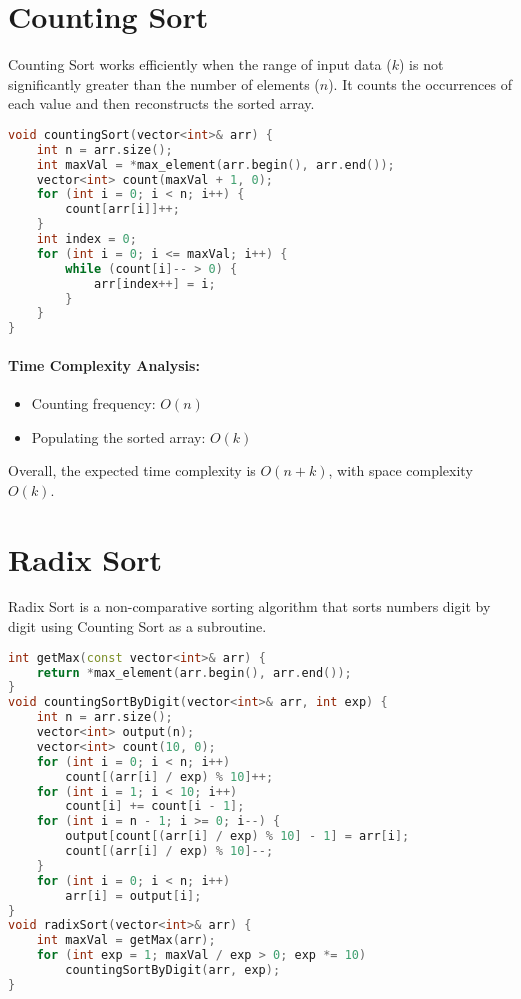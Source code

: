 \section{Counting Sort}
Counting Sort works efficiently when the range of input data (\(k\)) is not significantly greater than the number of elements (\(n\)). It counts the occurrences of each value and then reconstructs the sorted array.

\begin{lstlisting}[language=C++, caption={Counting Sort Implementation}]
void countingSort(vector<int>& arr) {
    int n = arr.size();
    int maxVal = *max_element(arr.begin(), arr.end());
    vector<int> count(maxVal + 1, 0);
    for (int i = 0; i < n; i++) {
        count[arr[i]]++;
    }
    int index = 0;
    for (int i = 0; i <= maxVal; i++) {
        while (count[i]-- > 0) {
            arr[index++] = i;
        }
    }
}
\end{lstlisting}

\paragraph{Time Complexity Analysis:}
\begin{itemize}
  \item Counting frequency: \(O(n)\)
  \item Populating the sorted array: \(O(k)\)
\end{itemize}
Overall, the expected time complexity is \(O(n + k)\), with space complexity \(O(k)\).

\section{Radix Sort}
Radix Sort is a non-comparative sorting algorithm that sorts numbers digit by digit using Counting Sort as a subroutine.

\begin{lstlisting}[language=C++, caption={Radix Sort Implementation}]
int getMax(const vector<int>& arr) {
    return *max_element(arr.begin(), arr.end());
}
void countingSortByDigit(vector<int>& arr, int exp) {
    int n = arr.size();
    vector<int> output(n);
    vector<int> count(10, 0);
    for (int i = 0; i < n; i++)
        count[(arr[i] / exp) % 10]++;
    for (int i = 1; i < 10; i++)
        count[i] += count[i - 1];
    for (int i = n - 1; i >= 0; i--) {
        output[count[(arr[i] / exp) % 10] - 1] = arr[i];
        count[(arr[i] / exp) % 10]--;
    }
    for (int i = 0; i < n; i++)
        arr[i] = output[i];
}
void radixSort(vector<int>& arr) {
    int maxVal = getMax(arr);
    for (int exp = 1; maxVal / exp > 0; exp *= 10)
        countingSortByDigit(arr, exp);
}
\end{lstlisting}

